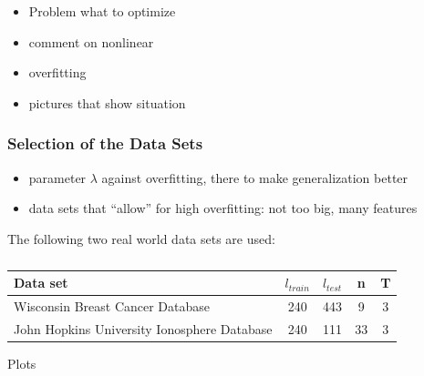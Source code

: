 \begin{itemize}
	\item Problem what to optimize
	\item comment on nonlinear 
	\item overfitting
	\item pictures that show situation
\end{itemize}


\subsubsection{Selection of the Data Sets}

\begin{itemize}
	\item parameter \(\lambda\) against overfitting, there to make generalization better
	\item data sets that ``allow'' for high overfitting: not too big, many features
\end{itemize}

The following two real world data sets are used:

\begin{center}
\begin{table}[H]%
	\begin{tabular}{lcccc}
		\hline
    Data set & \(l_{train}\) & \(l_{test}\) & n & T \\
		\hline
		Wisconsin Breast Cancer Database & 240 & 443 & 9 & 3 \\
		John Hopkins University Ionosphere Database & 240 & 111 & 33 & 3
	\end{tabular}
	\caption{}
\end{table}
\end{center}


Plots

